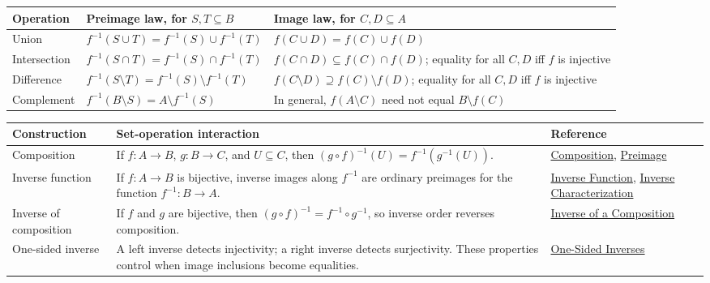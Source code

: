 \begin{remark*}[Exposition]
\mbox{}\par\smallskip
\small
\begin{tabularx}{\textwidth}{l X X}
\toprule
\textbf{Operation} & \textbf{Preimage law, for $S,T\subseteq B$} & \textbf{Image law, for $C,D\subseteq A$} \\
\midrule
Union
& $f^{-1}(S\cup T)=f^{-1}(S)\cup f^{-1}(T)$
& $f(C\cup D)=f(C)\cup f(D)$ \\
Intersection
& $f^{-1}(S\cap T)=f^{-1}(S)\cap f^{-1}(T)$
& $f(C\cap D)\subseteq f(C)\cap f(D)$; equality for all $C,D$ iff $f$ is injective \\
Difference
& $f^{-1}(S\setminus T)=f^{-1}(S)\setminus f^{-1}(T)$
& $f(C\setminus D)\supseteq f(C)\setminus f(D)$; equality for all $C,D$ iff $f$ is injective \\
Complement
& $f^{-1}(B\setminus S)=A\setminus f^{-1}(S)$
& In general, $f(A\setminus C)$ need not equal $B\setminus f(C)$ \\
\bottomrule
\end{tabularx}
\end{remark*}

\begin{remark*}[Exposition]
\mbox{}\par\smallskip
\small
\begin{tabularx}{\textwidth}{l X X}
\toprule
\textbf{Construction} & \textbf{Set-operation interaction} & \textbf{Reference} \\
\midrule
Composition
& If $f:A\to B$, $g:B\to C$, and $U\subseteq C$, then
$(g\circ f)^{-1}(U)=f^{-1}(g^{-1}(U))$.
& \hyperref[def:composition]{Composition}, \hyperref[def:preimage]{Preimage} \\
Inverse function
& If $f:A\to B$ is bijective, inverse images along $f^{-1}$ are ordinary
preimages for the function $f^{-1}:B\to A$.
& \hyperref[def:inverse]{Inverse Function}, \hyperref[thm:inverse-char]{Inverse Characterization} \\
Inverse of composition
& If $f$ and $g$ are bijective, then
$(g\circ f)^{-1}=f^{-1}\circ g^{-1}$, so inverse order reverses composition.
& \hyperref[thm:inverse-comp]{Inverse of a Composition} \\
One-sided inverse
& A left inverse detects injectivity; a right inverse detects surjectivity.
These properties control when image inclusions become equalities.
& \hyperref[thm:one-sided]{One-Sided Inverses} \\
\bottomrule
\end{tabularx}
\end{remark*}

